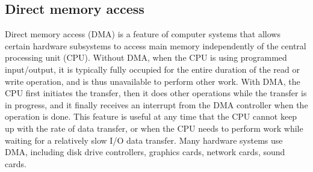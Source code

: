 \subsection{Direct memory access}
Direct memory access (DMA) is a feature of computer systems that allows certain hardware subsystems to access main memory independently of the central processing unit (CPU). Without DMA, when the CPU is using programmed input/output, it is typically fully occupied for the entire duration of the read or write operation, and is thus unavailable to perform other work. With DMA, the CPU first initiates the transfer, then it does other operations while the transfer is in progress, and it finally receives an interrupt from the DMA controller when the operation is done. This feature is useful at any time that the CPU cannot keep up with the rate of data transfer, or when the CPU needs to perform work while waiting for a relatively slow I/O data transfer.  Many hardware systems use DMA, including disk drive controllers, graphics cards, network cards, sound cards.